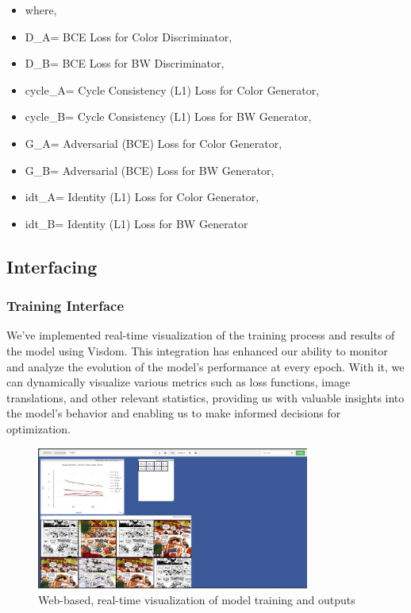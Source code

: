   \begin{itemize}
    \renewcommand\labelitemi{}
    \item   where,
    \renewcommand\labelitemi{-}
          \item   D\_A= BCE Loss for Color Discriminator, 
          \item  D\_B= BCE Loss for BW Discriminator,
          \item cycle\_A= Cycle Consistency (L1) Loss  for Color Generator, 
          \item  cycle\_B= Cycle Consistency (L1) Loss for BW Generator,
          \item  G\_A= Adversarial (BCE) Loss for Color Generator,
          \item  G\_B= Adversarial (BCE) Loss for BW Generator, 
          \item  idt\_A= Identity (L1) Loss for Color Generator,
          \item  idt\_B= Identity (L1) Loss for BW Generator
 \end{itemize}

\newpage
\subsection{Interfacing}

\subsubsection{Training Interface}
We've implemented real-time visualization of the training process and results of the model using Visdom. This integration has enhanced our ability to monitor and analyze the evolution of the model's performance at every epoch. With it, we can dynamically visualize various metrics such as loss functions, image translations, and other relevant statistics, providing us with valuable insights into the model's behavior and enabling us to make informed decisions for optimization.

\begin{figure}[h!]
  \centering
  \includegraphics[width=0.8\textwidth]{img/visdom.png}
  \caption{Web-based, real-time visualization of model training and outputs}
  \label{fig:visdom}
\end{figure}


